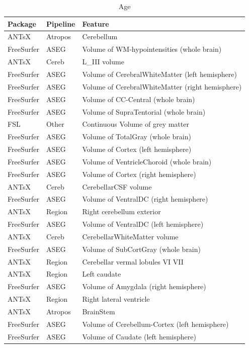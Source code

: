 \documentclass[
  10pt,
]{article}
\begin{document}
\begin{table}

\caption{\label{tab:compare-predictions}Age}
\centering
\begin{tabular}[t]{lll}
\toprule
Package & Pipeline & Feature\\
\midrule
ANTsX & Atropos & Cerebellum\\
FreeSurfer & ASEG & Volume of WM-hypointensities (whole brain)\\
ANTsX & Cereb & L\_III volume\\
FreeSurfer & ASEG & Volume of CerebralWhiteMatter (left hemisphere)\\
FreeSurfer & ASEG & Volume of CerebralWhiteMatter (right hemisphere)\\
\addlinespace
FreeSurfer & ASEG & Volume of CC-Central (whole brain)\\
FreeSurfer & ASEG & Volume of SupraTentorial (whole brain)\\
FSL & Other & Continuous    Volume of grey matter\\
FreeSurfer & ASEG & Volume of TotalGray (whole brain)\\
FreeSurfer & ASEG & Volume of Cortex (left hemisphere)\\
\addlinespace
FreeSurfer & ASEG & Volume of VentricleChoroid (whole brain)\\
FreeSurfer & ASEG & Volume of Cortex (right hemisphere)\\
ANTsX & Cereb & CerebellarCSF volume\\
FreeSurfer & ASEG & Volume of VentralDC (right hemisphere)\\
ANTsX & Region & Right cerebellum exterior\\
\addlinespace
FreeSurfer & ASEG & Volume of VentralDC (left hemisphere)\\
ANTsX & Cereb & CerebellarWhiteMatter volume\\
FreeSurfer & ASEG & Volume of SubCortGray (whole brain)\\
ANTsX & Region & Cerebellar vermal lobules VI VII\\
ANTsX & Region & Left caudate\\
\addlinespace
FreeSurfer & ASEG & Volume of Amygdala (right hemisphere)\\
ANTsX & Region & Right lateral ventricle\\
ANTsX & Atropos & BrainStem\\
FreeSurfer & ASEG & Volume of Cerebellum-Cortex (left hemisphere)\\
FreeSurfer & ASEG & Volume of Caudate (left hemisphere)\\
\bottomrule
\end{tabular}
\end{table}
\end{document}

